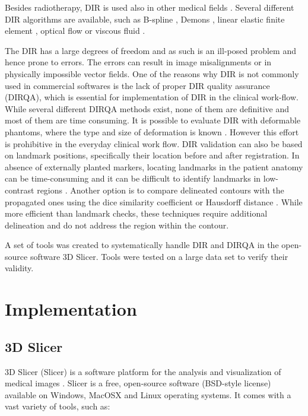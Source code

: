 Besides radiotherapy, DIR is used also in other medical fields \cite{Cleary2010, Herrell2012, Nithiananthan2011, Naini2010}.
Several different DIR algorithms are available, such as B-spline \cite{Rueckert1999}, Demons \cite{Thirion1998}, linear elastic finite element \cite{Venugopal2005}, optical flow \cite{Zhong2007} or viscous fluid \cite{Christensen1996}.
	
The DIR has a large degrees of freedom and as such is an ill-posed problem and hence prone to errors. The errors can result in image misalignments or in physically impossible vector fields. 
One of the reasons why DIR is not commonly used in commercial softwares is the lack of proper DIR quality assurance (DIRQA), which is essential for implementation of DIR in the clinical work-flow. While several different DIRQA methods exist, none of them are definitive and most of them are time consuming. 
It is possible to evaluate DIR with deformable phantoms, where the type and size of deformation is known \cite{Kashani2007, Kirby2011}. However this effort is prohibitive 
in the everyday clinical work flow. DIR validation can also be based on landmark positions, specifically their location before and after registration. In absence of externally planted markers, locating landmarks in the patient 
anatomy can be time-consuming and it can be difficult to identify landmarks in low-contrast regions \cite{Varadhan2013}. Another option is to compare delineated contours with the propagated ones using the dice similarity coefficient \cite{Varadhan2013} or Hausdorff distance \cite{Huttenlocher1993}. 
While more efficient than landmark checks, these techniques require additional delineation and do not address the region within the contour.

A set of tools was created to systematically handle DIR and DIRQA in the open-source software 3D Slicer. Tools were tested on a large data set to verify their validity.

\newpage
\section{Implementation}
\label{Implementation}

\subsection{3D Slicer}
\label{Slicer}

3D Slicer (Slicer) is a software platform for the analysis and visualization of medical images \cite{Slicer, Fedorov2012}. Slicer is a free, open-source software (BSD-style license) available on Windows, MacOSX and Linux operating systems. 
It comes with a vast variety of tools, such as:

